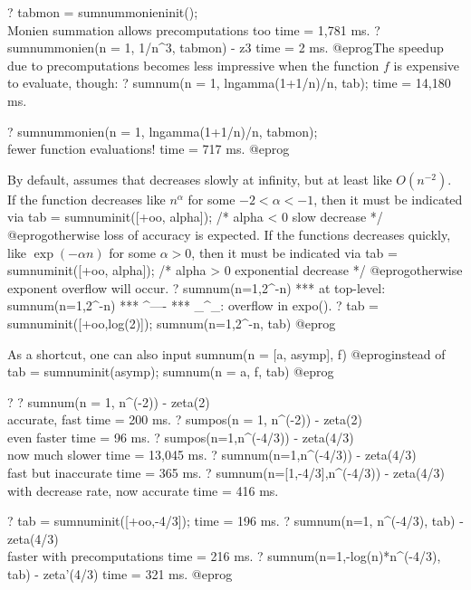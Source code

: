 ? tabmon = sumnummonieninit(); \\ Monien summation allows precomputations too
time = 1,781 ms.
? sumnummonien(n = 1, 1/n^3, tabmon) - z3
time = 2 ms.
@eprog\noindent The speedup due to precomputations becomes less impressive
when the function $f$ is expensive to evaluate, though:
\bprog
? sumnum(n = 1, lngamma(1+1/n)/n, tab);
time = 14,180 ms.

? sumnummonien(n = 1, lngamma(1+1/n)/n, tabmon); \\ fewer function evaluations!
time = 717 ms.
@eprog

By default,  assumes that  decreases slowly at infinity,
but at least like $O(n^{-2})$. If the function decreases like $n^{\alpha}$
for some $-2 < \alpha < -1$, then it must be indicated via
\bprog
  tab = sumnuminit([+oo, alpha]); /* alpha < 0 slow decrease */
@eprog\noindent otherwise loss of accuracy is expected.
If the functions decreases quickly, like $\exp(-\alpha n)$ for some
$\alpha > 0$, then it must be indicated via
\bprog
  tab = sumnuminit([+oo, alpha]); /* alpha  > 0 exponential decrease */
@eprog\noindent otherwise exponent overflow will occur.
\bprog
? sumnum(n=1,2^-n)
 ***   at top-level: sumnum(n=1,2^-n)
 ***                             ^----
 *** _^_: overflow in expo().
? tab = sumnuminit([+oo,log(2)]); sumnum(n=1,2^-n, tab)
@eprog

As a shortcut, one can also input
\bprog
  sumnum(n = [a, asymp], f)
@eprog\noindent instead of
\bprog
  tab = sumnuminit(asymp);
  sumnum(n = a, f, tab)
@eprog

\bprog
? 
? sumnum(n = 1, n^(-2)) - zeta(2) \\ accurate, fast
time = 200 ms.
? sumpos(n = 1, n^(-2)) - zeta(2)  \\ even faster
time = 96 ms.
? sumpos(n=1,n^(-4/3)) - zeta(4/3)   \\ now much slower
time = 13,045 ms.
? sumnum(n=1,n^(-4/3)) - zeta(4/3)  \\ fast but inaccurate
time = 365 ms.
? sumnum(n=[1,-4/3],n^(-4/3)) - zeta(4/3) \\ with decrease rate, now accurate
time = 416 ms.

? tab = sumnuminit([+oo,-4/3]);
time = 196 ms.
? sumnum(n=1, n^(-4/3), tab) - zeta(4/3) \\ faster with precomputations
time = 216 ms.
? sumnum(n=1,-log(n)*n^(-4/3), tab) - zeta'(4/3)
time = 321 ms.
@eprog

